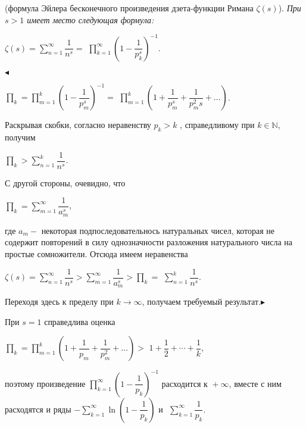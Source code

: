 \begin{approval}
(формула Эйлера бесконечного произведения дзета-функции Римана $\zeta(s)$). \slshape{При $s>1$ имеет место
следующая формула}:
\begin{center}
$\zeta(s) = \sum\limits_{n=1}^{\infty}\dfrac{1}{n^s} =$ 
$\prod\limits_{k=1}^{\infty}\left(1 - \dfrac{1}{p_k^s}\right)^{-1}$.
\end{center}
\end{approval}

$\blacktriangleleft$ \upshape\mdseries{} 
\begin{center}
$\prod_k = \prod\limits_{m=1}^{k}\left(1 - \dfrac{1}{p_m^s}\right)^{-1} =$ 
$\prod\limits_{m=1}^{k}\left(1 + \dfrac{1}{p_m^s} + \dfrac{1}{p_m^2s} + \ldots\right)$.
\end{center}
Раскрывая скобки, согласно неравенству $p_k>k$ , справедливому при $k\in\mathbb N$, получим
\begin{center}
$\prod_k>\sum\limits_{n=1}^{k}\dfrac{1}{n^s}$.
\end{center}
С другой стороны, очевидно, что 
\begin{center}
$\prod_k = \sum\limits_{m=1}^{\infty}\dfrac{1}{a_m^s}$,
\end{center}
где $a_m -$ некоторая подпоследовательнось натуральных чисел, которая не содержит повторений в силу однозначности 
разложения натурального числа на простые сомножители. Отсюда имеем неравенства
\begin{center}
$\zeta(s) = \sum\limits_{n=1}^{\infty}\dfrac{1}{n^s}>\sum\limits_{m=1}^{\infty}\dfrac{1}{a_m^s}>\prod_k = $
$\sum\limits_{n=1}^{k}\dfrac{1}{n^s}$.
\end{center}
Переходя здесь к пределу при $k\to\infty$, получаем требуемый результат.$\blacktriangleright$ 

При $s = 1$ справедлива оценка
\begin{center}
$\prod_k = \prod\limits_{m=1}^{k}\left(1 + \dfrac{1}{p_m} + \dfrac{1}{p_m^2} + \ldots\right)>$
$1 + \dfrac 12 + \cdots + \dfrac 1k$,
\end{center}
поэтому произведение $\prod\limits_{k=1}^{\infty}\left(1 - \dfrac{1}{p_k}\right)^{-1}\mbox{ расходится к }+\infty$,
вместе с ним расходятся и ряды $-\sum\limits_{k=1}^{\infty}\ln\left(1 - \dfrac{1}{p_k}\right)\mbox{ и }$
$\sum\limits_{k=1}^{\infty}\dfrac{1}{p_k}$.

